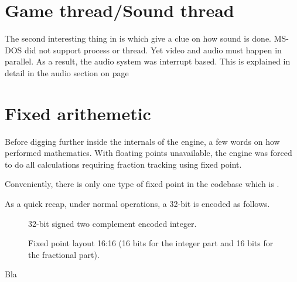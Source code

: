 \section{Game thread/Sound thread}
The second interesting thing in  is  which give a clue on how sound is done. MS-DOS did not support process or thread. Yet video and audio must happen in parallel. As a result, the audio system was interrupt based. This is explained in detail in the audio section on page \pageref{dmx_section}\\







\section{Fixed arithemetic}
Before digging further inside the internals of the engine, a few words on how \doom performed mathematics. With floating points unavailable, the engine was forced to do all calculations requiring fraction tracking using fixed point.\\
\par
Conveniently, there is only one type of fixed point in the codebase which is .\\
\par

\par
As a quick recap, under normal operations, a 32-bit  is encoded as follows.\\
\par
\begin{figure}[H]
 \centering
  
 \caption{32-bit signed two complement encoded integer.} \label{fig:mips}
\end{figure}

\begin{figure}[H]
 \centering
  
 \caption{Fixed point layout 16:16 (16 bits for the integer part and 16 bits for the fractional part).} \label{fig:mips}
\end{figure}

\pagebreak
Bla
\pagebreak

